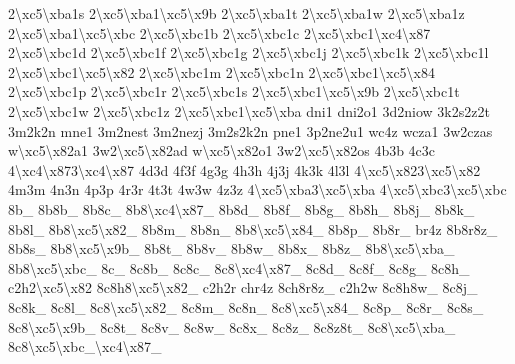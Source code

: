 \begin{DoxyCompactItemize}
2\textbackslash{}xc5\textbackslash{}xba1s 2\textbackslash{}xc5\textbackslash{}xba1\textbackslash{}xc5\textbackslash{}x9b 2\textbackslash{}xc5\textbackslash{}xba1t 2\textbackslash{}xc5\textbackslash{}xba1w 2\textbackslash{}xc5\textbackslash{}xba1z 2\textbackslash{}xc5\textbackslash{}xba1\textbackslash{}xc5\textbackslash{}xbc 2\textbackslash{}xc5\textbackslash{}xbc1b 2\textbackslash{}xc5\textbackslash{}xbc1c 2\textbackslash{}xc5\textbackslash{}xbc1\textbackslash{}xc4\textbackslash{}x87 2\textbackslash{}xc5\textbackslash{}xbc1d 2\textbackslash{}xc5\textbackslash{}xbc1f 2\textbackslash{}xc5\textbackslash{}xbc1g 2\textbackslash{}xc5\textbackslash{}xbc1j 2\textbackslash{}xc5\textbackslash{}xbc1k 2\textbackslash{}xc5\textbackslash{}xbc1l 2\textbackslash{}xc5\textbackslash{}xbc1\textbackslash{}xc5\textbackslash{}x82 2\textbackslash{}xc5\textbackslash{}xbc1m 2\textbackslash{}xc5\textbackslash{}xbc1n 2\textbackslash{}xc5\textbackslash{}xbc1\textbackslash{}xc5\textbackslash{}x84 2\textbackslash{}xc5\textbackslash{}xbc1p 2\textbackslash{}xc5\textbackslash{}xbc1r 2\textbackslash{}xc5\textbackslash{}xbc1s 2\textbackslash{}xc5\textbackslash{}xbc1\textbackslash{}xc5\textbackslash{}x9b 2\textbackslash{}xc5\textbackslash{}xbc1t 2\textbackslash{}xc5\textbackslash{}xbc1w 2\textbackslash{}xc5\textbackslash{}xbc1z 2\textbackslash{}xc5\textbackslash{}xbc1\textbackslash{}xc5\textbackslash{}xba dni1 dni2o1 3d2niow 3k2s2z2t 3m2k2n mne1 3m2nest 3m2nezj 3m2s2k2n pne1 3p2ne2u1 wc4z wcza1 3w2czas w\textbackslash{}xc5\textbackslash{}x82a1 3w2\textbackslash{}xc5\textbackslash{}x82ad w\textbackslash{}xc5\textbackslash{}x82o1 3w2\textbackslash{}xc5\textbackslash{}x82os 4b3b 4c3c 4\textbackslash{}xc4\textbackslash{}x873\textbackslash{}xc4\textbackslash{}x87 4d3d 4f3f 4g3g 4h3h 4j3j 4k3k 4l3l 4\textbackslash{}xc5\textbackslash{}x823\textbackslash{}xc5\textbackslash{}x82 4m3m 4n3n 4p3p 4r3r 4t3t 4w3w 4z3z 4\textbackslash{}xc5\textbackslash{}xba3\textbackslash{}xc5\textbackslash{}xba 4\textbackslash{}xc5\textbackslash{}xbc3\textbackslash{}xc5\textbackslash{}xbc 8b\-\_\- 8b8b\-\_\- 8b8c\-\_\- 8b8\textbackslash{}xc4\textbackslash{}x87\-\_\- 8b8d\-\_\- 8b8f\-\_\- 8b8g\-\_\- 8b8h\-\_\- 8b8j\-\_\- 8b8k\-\_\- 8b8l\-\_\- 8b8\textbackslash{}xc5\textbackslash{}x82\-\_\- 8b8m\-\_\- 8b8n\-\_\- 8b8\textbackslash{}xc5\textbackslash{}x84\-\_\- 8b8p\-\_\- 8b8r\-\_\- br4z 8b8r8z\-\_\- 8b8s\-\_\- 8b8\textbackslash{}xc5\textbackslash{}x9b\-\_\- 8b8t\-\_\- 8b8v\-\_\- 8b8w\-\_\- 8b8x\-\_\- 8b8z\-\_\- 8b8\textbackslash{}xc5\textbackslash{}xba\-\_\- 8b8\textbackslash{}xc5\textbackslash{}xbc\-\_\- 8c\-\_\- 8c8b\-\_\- 8c8c\-\_\- 8c8\textbackslash{}xc4\textbackslash{}x87\-\_\- 8c8d\-\_\- 8c8f\-\_\- 8c8g\-\_\- 8c8h\-\_\- c2h2\textbackslash{}xc5\textbackslash{}x82 8c8h8\textbackslash{}xc5\textbackslash{}x82\-\_\- c2h2r chr4z 8ch8r8z\-\_\- c2h2w 8c8h8w\-\_\- 8c8j\-\_\- 8c8k\-\_\- 8c8l\-\_\- 8c8\textbackslash{}xc5\textbackslash{}x82\-\_\- 8c8m\-\_\- 8c8n\-\_\- 8c8\textbackslash{}xc5\textbackslash{}x84\-\_\- 8c8p\-\_\- 8c8r\-\_\- 8c8s\-\_\- 8c8\textbackslash{}xc5\textbackslash{}x9b\-\_\- 8c8t\-\_\- 8c8v\-\_\- 8c8w\-\_\- 8c8x\-\_\- 8c8z\-\_\- 8c8z8t\-\_\- 8c8\textbackslash{}xc5\textbackslash{}xba\-\_\- 8c8\textbackslash{}xc5\textbackslash{}xbc\-\_\textbackslash{}xc4\textbackslash{}x87\-\_\- 
\end{DoxyCompactItemize}
